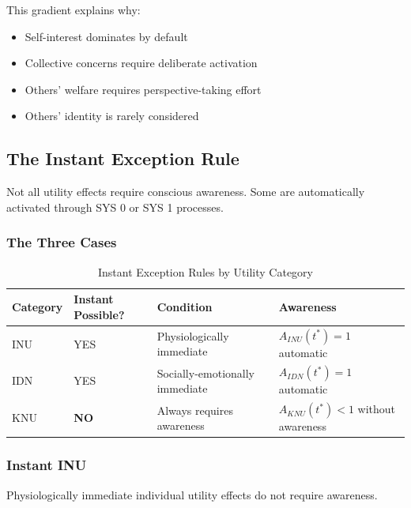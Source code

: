 This gradient explains why:
\begin{itemize}
\item Self-interest dominates by default
\item Collective concerns require deliberate activation
\item Others' welfare requires perspective-taking effort
\item Others' identity is rarely considered
\end{itemize}

\subsection{The Instant Exception Rule}
\label{subsec:instant-exception}

Not all utility effects require conscious awareness. Some are automatically
activated through SYS 0 or SYS 1 processes.

\subsubsection{The Three Cases}

\begin{table}[htbp]
\centering
\caption{Instant Exception Rules by Utility Category}
\label{tab:instant-exceptions}
\renewcommand{\arraystretch}{1.4}
\begin{tabular}{@{}llll@{}}
\toprule
\textbf{Category} & \textbf{Instant Possible?} & \textbf{Condition} & \textbf{Awareness} \\
\midrule
INU & YES & Physiologically immediate & $A_{INU}(t^*) = 1$ automatic \\
IDN & YES & Socially-emotionally immediate & $A_{IDN}(t^*) = 1$ automatic \\
KNU & \textbf{NO} & Always requires awareness & $A_{KNU}(t^*) < 1$ without awareness \\
\bottomrule
\end{tabular}
\end{table}

\subsubsection{Instant INU}

\begin{axiom}
\label{ax:instant-inu}
Physiologically immediate individual utility effects do not require awareness.
\end{axiom}

